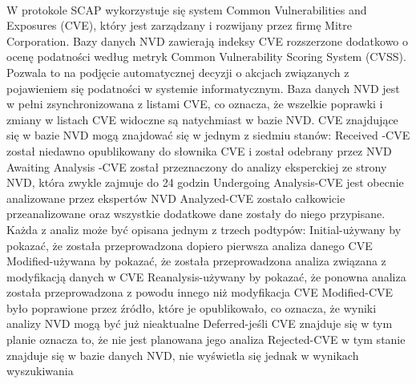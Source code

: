 \documentclass[a4paper,12pt,twoside]{article}
\newcommand\tab[1][1cm]{\hspace*{#1}}
\begin{document}
\paragraph{}
W protokole SCAP wykorzystuje się system Common Vulnerabilities and Exposures (CVE), który jest zarządzany i rozwijany przez firmę Mitre Corporation. Bazy danych NVD zawierają indeksy CVE rozszerzone dodatkowo o ocenę podatności według metryk Common Vulnerability Scoring System (CVSS). Pozwala to na podjęcie automatycznej decyzji o akcjach związanych z pojawieniem się podatności w systemie informatycznym. Baza danych NVD jest w pełni zsynchronizowana z listami CVE, co oznacza, że wszelkie poprawki i zmiany w listach CVE widoczne są natychmiast w bazie NVD. CVE znajdujące się w bazie NVD mogą znajdować się w jednym z siedmiu stanów:
\newline Received  \tab\tab\tab -\tab CVE został niedawno opublikowany do słownika CVE i został odebrany przez NVD\newline{}
Awaiting   Analysis \tab-\tab CVE został przeznaczony do analizy eksperckiej ze strony NVD, która zwykle zajmuje do 24 godzin\newline{}
Undergoing Analysis\tab -\tab CVE jest obecnie analizowane przez ekspertów NVD\newline{}
Analyzed\tab\tab -\tab CVE zostało całkowicie przeanalizowane oraz wszystkie dodatkowe dane zostały do niego przypisane. Każda z analiz może być opisana jednym z trzech podtypów:\newline{}
    \tab\tab Initial\tab\tab -\tab używany by pokazać, że została przeprowadzona dopiero pierwsza analiza danego CVE\newline{}
    \tab\tab Modified\tab\tab -\tab używana by pokazać, że została przeprowadzona analiza związana z modyfikacją danych w CVE\newline{}
    \tab\tab Reanalysis\tab\tab -\tab używany by pokazać, że ponowna analiza została przeprowadzona z powodu innego niż modyfikacja CVE\newline{}
Modified\tab\tab\tab -\tab CVE było poprawione przez źródło, które je opublikowało, co oznacza, że wyniki analizy NVD mogą być już nieaktualne\newline{}
Deferred\tab\tab\tab -\tab jeśli CVE znajduje się w tym planie oznacza to, że nie jest planowana jego analiza\newline{}
Rejected\tab\tab\tab -\tab CVE w tym stanie znajduje się w bazie danych NVD, nie wyświetla się jednak w wynikach wyszukiwania\newline{}
\end{document}
